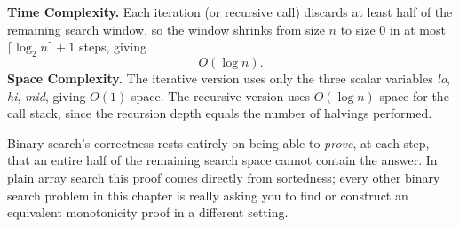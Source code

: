 \begin{complexitybox}
\textbf{Time Complexity.} Each iteration (or recursive call) discards at
least half of the remaining search window, so the window shrinks from size
$n$ to size $0$ in at most $\lceil \log_2 n \rceil + 1$ steps, giving
\[
  O(\log n).
\]
\textbf{Space Complexity.} The iterative version uses only the three
scalar variables \textit{lo}, \textit{hi}, \textit{mid}, giving $O(1)$
space. The recursive version uses $O(\log n)$ space for the call stack,
since the recursion depth equals the number of halvings performed.
\end{complexitybox}

\begin{takeawaybox}
Binary search's correctness rests entirely on being able to \emph{prove},
at each step, that an entire half of the remaining search space cannot
contain the answer. In plain array search this proof comes directly from
sortedness; every other binary search problem in this chapter is really
asking you to find or construct an equivalent monotonicity proof in a
different setting.
\end{takeawaybox}
